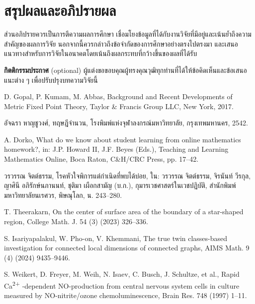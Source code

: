 \documentclass[12pt, a4paper, twoside]{article}
\theoremstyle{plain}
\theoremstyle{definition}
\theoremstyle{remark}
\numberwithin{equation}{section}
\begin{document}
\section{สรุปผลและอภิปรายผล}
ส่วนอภิปรายควรเป็นการตีความผลการศึกษา เชื่อมโยงข้อมูลที่ได้กับงานวิจัยที่มีอยู่และเน้นย้ำถึงความสำคัญของผลการวิจัย นอกจากนี้ควรกล่าวถึงข้อจำกัดของการศึกษาอย่างตรงไปตรงมา และเสนอแนวทางสำหรับการวิจัยในอนาคตโดยเน้นถึงผลกระทบที่กว้างขึ้นของผลที่ได้รับ

\bigskip\noindent
\textbf{กิตติกรรมประกาศ} (optional) ผู้แต่งขอขอบคุณผู้ทรงคุณวุฒิทุกท่านที่ได้ให้ข้อคิดเห็นและข้อเสนอแนะต่าง ๆ เพื่อปรับปรุงบทความวิจัยนี้ 

\renewcommand{\refname}{เอกสารอ้างอิง}

\begin{thebibliography}{99}

D. Gopal, P. Kumam, M. Abbas, Background and Recent Developments of Metric Fixed Point Theory, Taylor \& Francis Group LLC, New York, 2017.

อัจฉรา หาญชูวงศ์, ทฤษฎีจำนวน, โรงพิมพ์แห่งจุฬาลงกรณ์มหาวิทยาลัย, กรุงเทพมหานคร, 2542.

A. Dorko, What do we know about student learning from online mathematics homework?, in: J.P. Howard II, J.F. Beyes (Eds.), Teaching and Learning Mathematics Online, Boca Raton, C\&H/CRC Press, pp. 17--42.

วรวรรณ จิตต์ธรรม, โรคหัวใจพิการแต่กำเนิดที่พบได้บ่อย, ใน: วรวรรณ จิตต์ธรรม, จิรนันท์ วีรกุล, ญาศินี อภิรักษ์นภานนท์, ชุติมา เผือกสามัญ (บ.ก.), กุมารเวชศาสตร์ในเวชปฏิบัติ, สํานักพิมพ์มหาวิทยาลัยนเรศวร, พิษณุโลก, น. 243--280.

 T. Theerakarn, On the center of surface area of the boundary of a star-shaped region, College Math. J. 54 (3) (2023) 326--336.

 S. Isariyapalakul, W. Pho-on, V. Khemmani, The true twin classes-based investigation for connected local dimensions of connected graphs, AIMS Math. 9 (4) (2024) 9435--9446.

 S. Weikert, D. Freyer, M. Weih, N. Isaev, C. Busch, J. Schultze, et al., Rapid Ca\textsuperscript{2+}
-dependent NO-production from central nervous system cells in culture measured by NO-nitrite/ozone chemoluminescence, Brain
Res. 748 (1997) 1--11.


\end{thebibliography}
\end{document}
